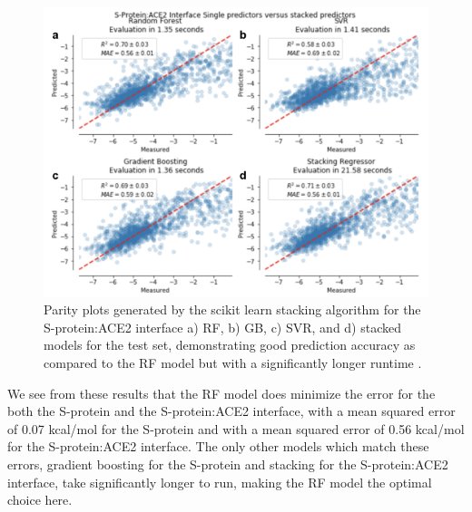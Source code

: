\documentclass[11pt]{article}
\begin{document}
   \begin{figure}
     \centering
     \includegraphics[width=120mm]{intStacked}
     \caption{Parity plots generated by the scikit learn stacking algorithm for the S-protein:ACE2 interface a) RF, b) GB, c) SVR, and d) stacked models for the test set, demonstrating good prediction accuracy as compared to the RF model but with a significantly longer runtime \cite{scikit}.}
     \label{fig:int}
   \end{figure} 
   
   We see from these results that the RF model does minimize the error for the both the S-protein and the S-protein:ACE2 interface, with a mean squared error of 0.07 kcal/mol for the S-protein and with a mean squared error of 0.56 kcal/mol for the S-protein:ACE2 interface. The only other models which match these errors, gradient boosting for the S-protein and stacking for the S-protein:ACE2 interface, take significantly longer to run, making the RF model the optimal choice here. 
   
\end{document}
